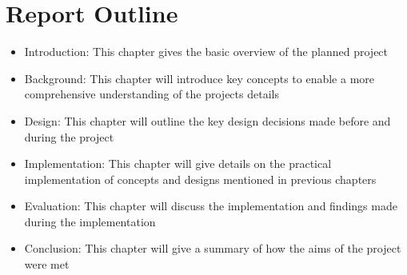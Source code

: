 \section{Report Outline}
\begin{itemize}
    \item Introduction: This chapter gives the basic overview of the planned project
    \item Background: This chapter will introduce key concepts to enable a more comprehensive understanding of the projects details
    \item Design: This chapter will outline the key design decisions made before and during the project
    \item Implementation: This chapter will give details on the practical implementation of concepts and designs mentioned in previous chapters
    \item Evaluation: This chapter will discuss the implementation and findings made during the implementation
    \item Conclusion: This chapter will give a summary of how the aims of the project were met 
\end{itemize}

